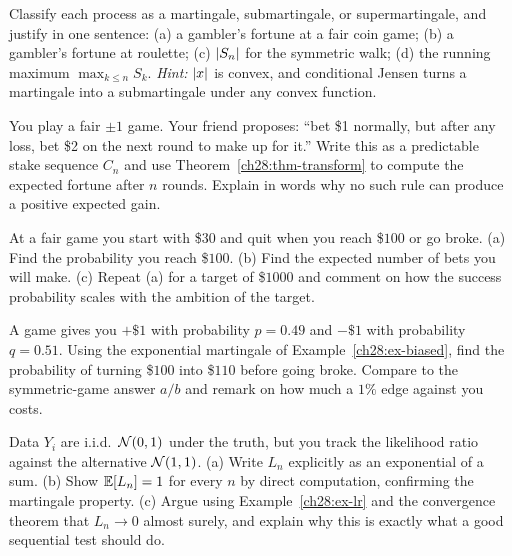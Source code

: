 \begin{exercise}
\label{ch28:exer-def}
Classify each process as a martingale, submartingale, or supermartingale, and justify in one sentence:
(a) a gambler's fortune at a fair coin game; (b) a gambler's fortune at roulette; (c) $\lvert S_n\rvert$ for
the symmetric walk; (d) the running maximum $\max_{k\le n} S_k$. \emph{Hint:} $\lvert x\rvert$ is convex, and
conditional Jensen turns a martingale into a submartingale under any convex function.
\end{exercise}

\begin{exercise}
\label{ch28:exer-predictable}
You play a fair $\pm 1$ game. Your friend proposes: ``bet \$1 normally, but after any loss, bet \$2 on
the next round to make up for it.'' Write this as a predictable stake sequence $C_n$ and use
Theorem~\ref{ch28:thm-transform} to compute the expected fortune after $n$ rounds. Explain in words why
no such rule can produce a positive expected gain.
\end{exercise}

\begin{exercise}
\label{ch28:exer-ruin}
At a fair game you start with \$$30$ and quit when you reach \$$100$ or go broke. (a) Find the
probability you reach \$$100$. (b) Find the expected number of bets you will make. (c) Repeat (a) for a
target of \$$1000$ and comment on how the success probability scales with the ambition of the target.
\end{exercise}

\begin{exercise}
\label{ch28:exer-biased}
A game gives you $+\$1$ with probability $p = 0.49$ and $-\$1$ with probability $q = 0.51$. Using the
exponential martingale of Example~\ref{ch28:ex-biased}, find the probability of turning \$$100$ into
\$$110$ before going broke. Compare to the symmetric-game answer $a/b$ and remark on how much a
$1\%$ edge against you costs.
\end{exercise}

\begin{exercise}
\label{ch28:exer-lr}
Data $Y_i$ are i.i.d.\ $\mathcal{N}(0,1)$ under the truth, but you track the likelihood ratio against the
alternative $\mathcal{N}(1,1)$. (a) Write $L_n$ explicitly as an exponential of a sum. (b) Show
$\operatorname{\mathbb{E}}[L_n] = 1$ for every $n$ by direct computation, confirming the martingale property. (c) Argue using
Example~\ref{ch28:ex-lr} and the convergence theorem that $L_n \to 0$ almost surely, and explain why
this is exactly what a good sequential test should do.
\end{exercise}


